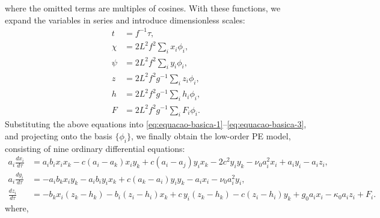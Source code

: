 where the omitted terms are multiples of cosines. With these functions, we expand the variables in series and introduce dimensionless scales:
\begin{align*}
    
t    & = f^{-1}\tau,               \\
    \chi & = 2L^2f^2 \sum_i x_i\phi_i,                                              \\
    \psi & = 2L^2f^2 \sum_i y_i\phi_i,                                              \\
    
z    & = 2L^2f^2g^{-1} \sum_i z_i\phi_i,                                        \\
    h    & = 2L^2f^2g^{-1} \sum_i h_i\phi_i,                                        \\
    F    & = 2L^2f^2g^{-1} \sum_i F_i\phi_i.
\end{align*}
Substituting the above equations into \eqref{eq:equacao-basica-1}–\eqref{eq:equacao-basica-3}, and projecting onto the basis $\{\phi_i\}$, we finally obtain the low-order PE model, consisting of nine ordinary differential equations:
\begin{align}
    a_i\frac{dx_i}{d\tau} & = a_ib_ix_ix_k - c(a_i - a_k)x_iy_k
          + c(a_i - a_j)y_ix_k -2c^2y_iy_k - \nu_0a_i^2x_i + a_iy_i - a_iz_i, \label{eq:pe-model-1}\\
    
a_i\frac{dy_i}{d\tau} & = -a_ib_kx_iy_k - a_ib_iy_ix_k           
    + c(a_k - a_i)y_iy_k - a_ix_i - \nu_0a_i^2y_i, \label{eq:model-pe-2}\\
    \frac{dz_i}{d\tau}    & = -b_kx_i(z_k - h_k) - b_i(z_i - h_i)x_k
     + c\,y_i(z_k - h_k) - c(z_i - h_i)y_k + g_0a_ix_i - \kappa_0a_iz_i + F_i. \label{eq:model-pe-3}
\end{align}
where,
